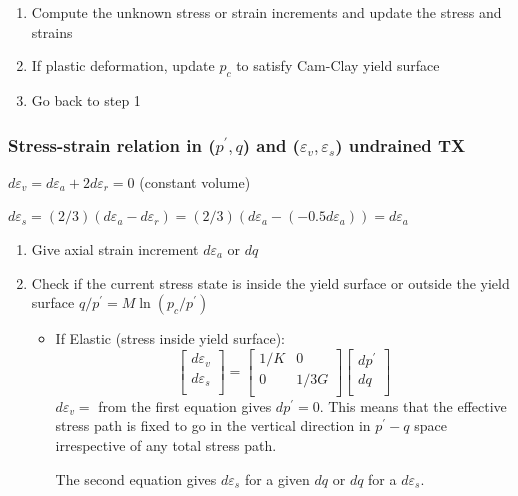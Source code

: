 \documentclass[notes]{beamer}
\begin{document}
\begin{frame}
\begin{enumerate}
\begin{enumerate}
\begin{equation*}
			\begin{bmatrix}
				M - (q/p^\prime) & 1     \\
				1 & 1/(M - (q/p^\prime)) \\
			\end{bmatrix}
			\right]
			\end{equation*}
	\end{enumerate}
	\item Compute the unknown stress or strain increments and update the stress and strains
	\item If plastic deformation, update $p_c$ to satisfy Cam-Clay yield surface
	\item Go back to step 1
\end{enumerate}
\end{frame}


\begin{frame}
\frametitle{Stress-strain relation in ($p^\prime, q$) and ($\varepsilon_v, \varepsilon_s$) undrained TX}
 $d\varepsilon_v = d\varepsilon_a + 2 d\varepsilon_r = 0$ (constant volume)

 $d\varepsilon_s = (2/3)(d\varepsilon_a - d\varepsilon_r) = (2/3)(d\varepsilon_a - (-0.5 d\varepsilon_a)) = d\varepsilon_a$
\begin{enumerate}
	\item Give axial strain increment $d\varepsilon_a$ or $dq$
	\item Check if the current stress state is inside the yield surface or outside the yield surface $q/p^\prime = M \ln (p_c/p^\prime)$
	\begin{itemize}
		\item If Elastic (stress inside yield surface):
		\begin{equation*}
		\begin{bmatrix}
			d\varepsilon_v \\
			d\varepsilon_s \\
		\end{bmatrix} = %
		\begin{bmatrix}
			1/K & 0 \\
			0 & 1/3G\\
		\end{bmatrix} %
		\begin{bmatrix}
			dp^\prime \\
			dq\\
		\end{bmatrix}
		\end{equation*}
		$d\varepsilon_v =$ from the first equation gives $dp^\prime = 0$. This means that the effective stress path is fixed to go in the vertical direction in $p^\prime - q$ space irrespective of any total stress path. 
		
		The second equation gives $d\varepsilon_s$ for a given $dq$ or $dq$ for a $d\varepsilon_s$.
	\end{itemize}
\end{enumerate}
\end{frame}
\end{document}
